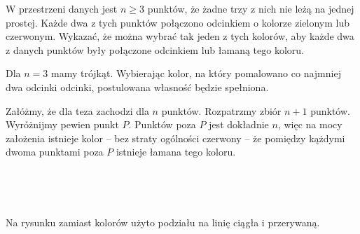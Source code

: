 \begin{problem}{4}
	W przestrzeni danych jest $n \geqslant 3$ punktów, że żadne trzy z nich nie leżą na jednej prostej. Każde dwa z tych punktów połączono odcinkiem o kolorze zielonym lub czerwonym. Wykazać, że można wybrać tak jeden z tych kolorów, aby każde dwa z danych punktów były połączone odcinkiem lub łamaną tego koloru.
\end{problem}

\noindent
Dla $n = 3$ mamy trójkąt. Wybierając kolor, na który pomalowano co najmniej dwa odcinki odcinki, postulowana własność będzie spełniona.

Załóżmy, że dla teza zachodzi dla $n$ punktów. Rozpatrzmy zbiór $n + 1$ punktów. Wyróżnijmy pewien punkt $P$. Punktów poza $P$ jest dokładnie $n$, więc na mocy założenia istnieje kolor -- bez straty ogólności czerwony -- że pomiędzy kążdymi dwoma punktami poza $P$ istnieje łamana tego koloru. 

\begin{minipage}{0.5\textwidth}
\begin{center}
\\

\end{center}
\end{minipage}
\begin{minipage}{0.5\textwidth}
\begin{center}
\\
\end{center}
\end{minipage}
\begin{center}
Na rysunku zamiast kolorów użyto podziału na linię ciągła i przerywaną.
\end{center}

